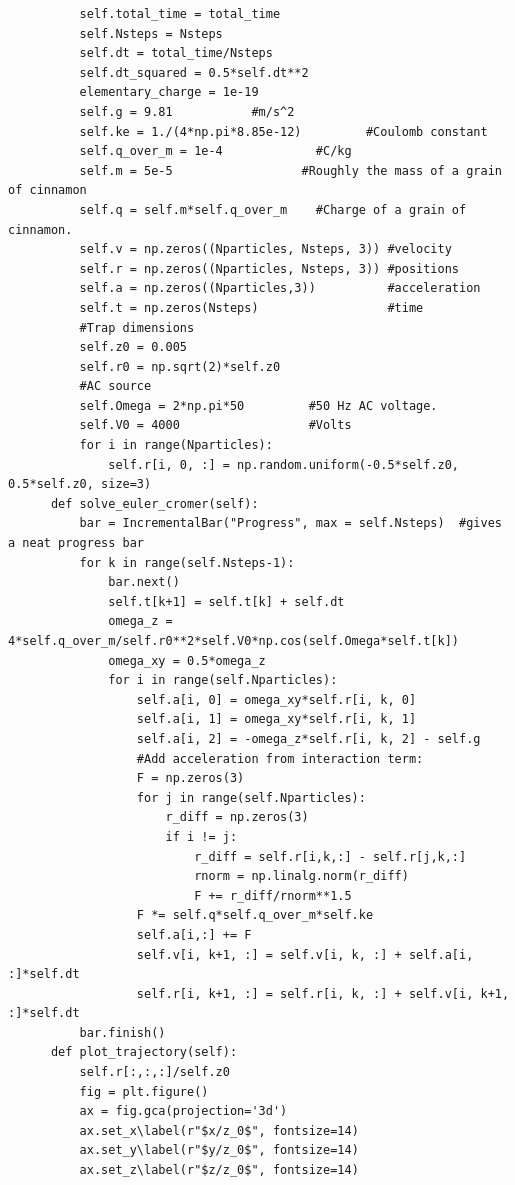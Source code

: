 \documentclass[%
oneside,                 %
final,                   %
10pt]{article}
\newenvironment{doconceexercise}{}{}
\begin{document}
\begin{doconceexercise}
\begin{verbatim}
          self.total_time = total_time
          self.Nsteps = Nsteps
          self.dt = total_time/Nsteps
          self.dt_squared = 0.5*self.dt**2
          elementary_charge = 1e-19
          self.g = 9.81           #m/s^2
          self.ke = 1./(4*np.pi*8.85e-12)         #Coulomb constant
          self.q_over_m = 1e-4             #C/kg
          self.m = 5e-5                  #Roughly the mass of a grain of cinnamon
          self.q = self.m*self.q_over_m    #Charge of a grain of cinnamon.
          self.v = np.zeros((Nparticles, Nsteps, 3)) #velocity
          self.r = np.zeros((Nparticles, Nsteps, 3)) #positions
          self.a = np.zeros((Nparticles,3))          #acceleration
          self.t = np.zeros(Nsteps)                  #time
          #Trap dimensions
          self.z0 = 0.005
          self.r0 = np.sqrt(2)*self.z0
          #AC source
          self.Omega = 2*np.pi*50         #50 Hz AC voltage.
          self.V0 = 4000                  #Volts
          for i in range(Nparticles):
              self.r[i, 0, :] = np.random.uniform(-0.5*self.z0, 0.5*self.z0, size=3)
      def solve_euler_cromer(self):
          bar = IncrementalBar("Progress", max = self.Nsteps)  #gives a neat progress bar
          for k in range(self.Nsteps-1):
              bar.next()
              self.t[k+1] = self.t[k] + self.dt
              omega_z = 4*self.q_over_m/self.r0**2*self.V0*np.cos(self.Omega*self.t[k])
              omega_xy = 0.5*omega_z
              for i in range(self.Nparticles):
                  self.a[i, 0] = omega_xy*self.r[i, k, 0]
                  self.a[i, 1] = omega_xy*self.r[i, k, 1]
                  self.a[i, 2] = -omega_z*self.r[i, k, 2] - self.g
                  #Add acceleration from interaction term:
                  F = np.zeros(3)
                  for j in range(self.Nparticles):
                      r_diff = np.zeros(3)
                      if i != j:
                          r_diff = self.r[i,k,:] - self.r[j,k,:]
                          rnorm = np.linalg.norm(r_diff)
                          F += r_diff/rnorm**1.5
                  F *= self.q*self.q_over_m*self.ke
                  self.a[i,:] += F
                  self.v[i, k+1, :] = self.v[i, k, :] + self.a[i, :]*self.dt
                  self.r[i, k+1, :] = self.r[i, k, :] + self.v[i, k+1, :]*self.dt
          bar.finish()
      def plot_trajectory(self):
          self.r[:,:,:]/self.z0
          fig = plt.figure()
          ax = fig.gca(projection='3d')
          ax.set_x\label(r"$x/z_0$", fontsize=14)
          ax.set_y\label(r"$y/z_0$", fontsize=14)
          ax.set_z\label(r"$z/z_0$", fontsize=14)

\end{verbatim}
\end{doconceexercise}
\end{document}
